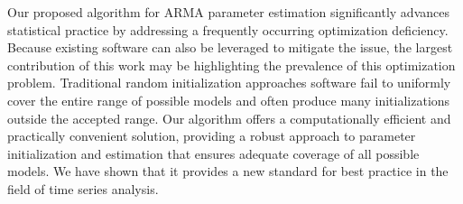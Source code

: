 Our proposed algorithm for ARMA parameter estimation significantly advances statistical practice by addressing a frequently occurring optimization deficiency.
Because existing software can also be leveraged to mitigate the issue, the largest contribution of this work may be highlighting the prevalence of this optimization problem.
Traditional random initialization approaches software fail to uniformly cover the entire range of possible models and often produce many initializations outside the accepted range.
Our algorithm offers a computationally efficient and practically convenient solution, providing a robust approach to parameter initialization and estimation that ensures adequate coverage of all possible models.
We have shown that it provides a new standard for best practice in the field of time series analysis.

